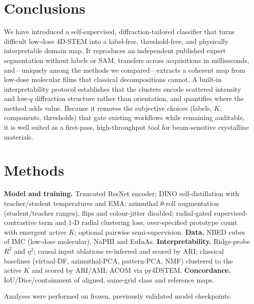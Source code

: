 \documentclass[journal=ancac3,manuscript=article,layout=twocolumn]{achemso}
\begin{document}
\section{Conclusions}
We have introduced a self-supervised, diffraction-tailored classifier that
turns difficult low-dose 4D-STEM into a label-free, threshold-free, and
physically interpretable domain map. It reproduces an independent published
expert segmentation without labels or SAM, transfers across acquisitions in
milliseconds, and---uniquely among the methods we compared---extracts a
coherent map from low-dose molecular films that classical decompositions
cannot. A built-in interpretability protocol establishes that the clusters
encode scattered intensity and low-$q$ diffraction structure rather than
orientation, and quantifies where the method adds value. Because it removes the
subjective choices (labels, $K$, components, thresholds) that gate existing
workflows while remaining auditable, it is well suited as a first-pass,
high-throughput tool for beam-sensitive crystalline materials.

\section{Methods}
\textbf{Model and training.} Truncated ResNet encoder; DINO self-distillation
with teacher/student temperatures and EMA; azimuthal $\theta$-roll augmentation
(student/teacher ranges), flips and colour-jitter disabled; radial-gated
supervised-contrastive term and 1-D radial clustering loss; over-specified
prototype count with emergent active $K$; optional pairwise semi-supervision.
\textbf{Data.} NBED cubes of IMC (low-dose molecular), NaPHI and EuInAs.
\textbf{Interpretability.} Ridge-probe $R^2$ and $\eta^2$; causal input
ablations re-inferred and scored by ARI; classical baselines (virtual-DF,
azimuthal-PCA, pattern-PCA, NMF) clustered to the active $K$ and scored by
ARI/AMI; ACOM via py4DSTEM\cite{savitzky2021,ophus2022}. \textbf{Concordance.}
IoU/Dice/containment of aligned, same-grid class and reference maps.

\begin{acknowledgement}
Analyses were performed on frozen, previously validated model checkpoints.
\end{acknowledgement}
\end{document}
